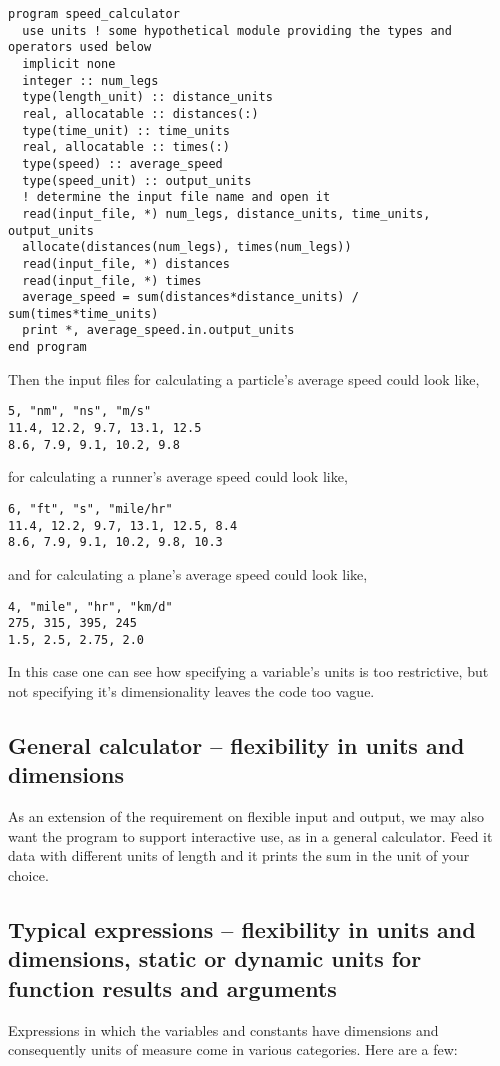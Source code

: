 \documentclass{article}
\begin{document}
\begin{verbatim}
program speed_calculator
  use units ! some hypothetical module providing the types and operators used below
  implicit none
  integer :: num_legs
  type(length_unit) :: distance_units
  real, allocatable :: distances(:)
  type(time_unit) :: time_units
  real, allocatable :: times(:)
  type(speed) :: average_speed
  type(speed_unit) :: output_units
  ! determine the input file name and open it
  read(input_file, *) num_legs, distance_units, time_units, output_units
  allocate(distances(num_legs), times(num_legs))
  read(input_file, *) distances
  read(input_file, *) times
  average_speed = sum(distances*distance_units) / sum(times*time_units)
  print *, average_speed.in.output_units
end program
\end{verbatim}

Then the input files for calculating a particle's average speed could look like,

\begin{verbatim}
5, "nm", "ns", "m/s"
11.4, 12.2, 9.7, 13.1, 12.5
8.6, 7.9, 9.1, 10.2, 9.8
\end{verbatim}

for calculating a runner's average speed could look like,

\begin{verbatim}
6, "ft", "s", "mile/hr"
11.4, 12.2, 9.7, 13.1, 12.5, 8.4
8.6, 7.9, 9.1, 10.2, 9.8, 10.3
\end{verbatim}

and for calculating a plane's average speed could look like,

\begin{verbatim}
4, "mile", "hr", "km/d"
275, 315, 395, 245
1.5, 2.5, 2.75, 2.0
\end{verbatim}

In this case one can see how specifying a variable's units is too restrictive,
but not specifying it's dimensionality leaves the code too vague.

\subsection*{General calculator -- flexibility in units and dimensions}
As an extension of the requirement on flexible input and output, we may also want the program to support interactive use,
as in a general calculator. Feed it data with different units of length and it prints the sum in the unit of your choice.

\subsection*{Typical expressions -- flexibility in units and dimensions, static or dynamic units for function results and arguments}
Expressions in which the variables and constants have dimensions and consequently units of measure come in various
categories. Here are a few:
\end{document}

